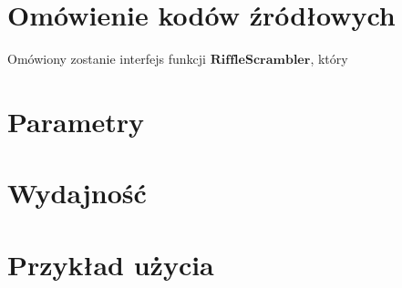 \section{Omówienie kodów źródłowych}
Omówiony zostanie interfejs funkcji $\mathbf{RiffleScrambler}$, który 

\section{Parametry}


\section{Wydajność}


\section{Przykład użycia}


